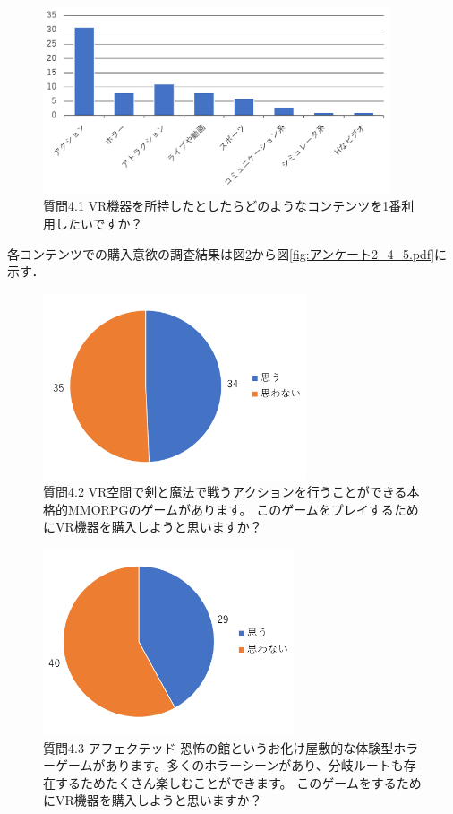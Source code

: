 \documentclass[12pt,a4j]{ltjsarticle}
\begin{document}
\begin{figure}[h]
\begin{center}
 \includegraphics[clip,height=55mm]{
 アンケート2_4_1.pdf}
\end{center}
 \caption{質問4.1 VR機器を所持したとしたらどのようなコンテンツを1番利用したいですか？}
 \label{fig:アンケート2_4_1.pdf}
\end{figure}

各コンテンツでの購入意欲の調査結果は図\ref{fig:アンケート2_4_2.pdf}から図\ref{fig:アンケート2_4_5.pdf}に示す．

\begin{figure}[h]
\begin{center}
 \includegraphics[clip,height=55mm]{
 アンケート2_4_2.pdf}
\end{center}
 \caption{質問4.2 VR空間で剣と魔法で戦うアクションを行うことができる本格的MMORPGのゲームがあります。
このゲームをプレイするためにVR機器を購入しようと思いますか？}
 \label{fig:アンケート2_4_2.pdf}
\end{figure}

\begin{figure}[h]
\begin{center}
 \includegraphics[clip,height=55mm]{
 アンケート2_4_3.pdf}
\end{center}
 \caption{質問4.3 アフェクテッド 恐怖の館というお化け屋敷的な体験型ホラーゲームがあります。多くのホラーシーンがあり、分岐ルートも存在するためたくさん楽しむことができます。
このゲームをするためにVR機器を購入しようと思いますか？}
 \label{fig:アンケート2_4_3.pdf}
\end{figure}
\end{document}
